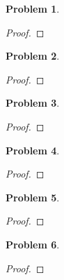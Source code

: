 \documentclass[10pt]{article}
\newcommand{\sk}{\vskip 10mm}
\theoremstyle{plain}
\newtheorem{problem}{Problem}
\theoremstyle{remark}
\begin{document}
\begin{problem}
  
\end{problem}

\begin{proof}
  
\end{proof}

\sk

\begin{problem}
  
\end{problem}

\begin{proof}
  
\end{proof}

\sk

\begin{problem}
  
\end{problem}

\begin{proof}
  
\end{proof}

\sk

\begin{problem}
  
\end{problem}

\begin{proof}
  
\end{proof}

\sk

\begin{problem}
  
\end{problem}

\begin{proof}
  
\end{proof}

\sk

\begin{problem}
  
\end{problem}

\begin{proof}
  
\end{proof}
  
\end{document}
